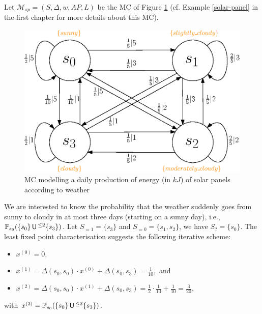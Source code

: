 \begin{example}
Let $\mathcal{M}_{sp} = (S, \Delta, w, AP, L)$ be the MC of Figure \ref{solarpanel} (cf. Example \ref{solar-panel} in the first chapter for more details about this MC).
  \begin{figure}[h!]
    \centering
    \includegraphics[width=0.5\linewidth]{resources/weather-solar-pannel}
    \captionsetup{justification=centering}
    \caption{MC modelling a daily production of energy (in $kJ$) of solar panels according to weather}
    \label{solarpanel}
  \end{figure}
  We are interested to know the probability that the weather suddenly goes from sunny to cloudy in at most three days
  (starting on a sunny day), i.e., $\mathbb{P}_{s_0}(\{s_0\} \,\text{\sffamily U}\,^{\leq 2} \{s_3\})$.
  Let $S_{=1} = \{s_3\}$ and $S_{=0} = \{ s_1, s_2 \}$, we have $S_? = \{s_0\}$. The least fixed point characterisation suggests the following iterative scheme:
  \begin{itemize}
    \item $x^{(0)} = 0$,
    \item $x^{(1)} = \Delta(s_0, s_0) \cdot x^{(0)} + \Delta(s_0, s_3) = \frac{1}{10},$ and
    \item $x^{(2)} = \Delta(s_0, s_0) \cdot x^{(1)} + \Delta(s_0, s_3) = \frac{1}{2} \cdot \frac{1}{10} + \frac{1}{10} = \frac{3}{20}$,
  \end{itemize}
  with $x^{(2)} = \mathbb{P}_{s_0}(\{s_0\} \,\text{\sffamily U}\,^{\leq 2} \{s_3\})$.
\end{example}
